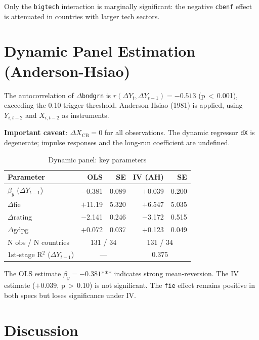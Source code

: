 \documentclass[12pt,a4paper]{article}
\begin{document}
\noindent Only the \texttt{bigtech} interaction is marginally significant:
the negative \texttt{cbenf} effect is attenuated in countries with larger
tech sectors.

\section{Dynamic Panel Estimation (Anderson-Hsiao)}

The autocorrelation of $\Delta$\texttt{bndgrn} is
$r(\Delta Y_t, \Delta Y_{t-1}) = -0.513$ (p\,$<$\,0.001), exceeding
the 0.10 trigger threshold. Anderson-Hsiao (1981) is applied, using
$Y_{i,t-2}$ and $X_{i,t-2}$ as instruments.

\noindent\textbf{Important caveat}: $\Delta X_{\text{CB}} = 0$ for all
observations. The dynamic regressor \texttt{dX} is degenerate; impulse
responses and the long-run coefficient are undefined.

\begin{table}[H]
\centering
\caption{Dynamic panel: key parameters}
\label{tab:dynamic}
\begin{tabular}{lrrrr}
\toprule
Parameter & OLS & SE & IV (AH) & SE \\
\midrule
$\beta_y$ ($\Delta Y_{t-1}$) & $-$0.381 & 0.089 & $+$0.039 & 0.200 \\
$\Delta$fie & $+$11.19 & 5.320 & $+$6.547 & 5.035 \\
$\Delta$rating & $-$2.141 & 0.246 & $-$3.172 & 0.515 \\
$\Delta$gdpg & $+$0.072 & 0.037 & $+$0.123 & 0.049 \\
\midrule
N obs / N countries & \multicolumn{2}{c}{131 / 34} &
                      \multicolumn{2}{c}{131 / 34} \\
1st-stage R$^2$ ($\Delta Y_{t-1}$) & \multicolumn{2}{c}{---} &
                                      \multicolumn{2}{c}{0.375} \\
\bottomrule
\end{tabular}
\end{table}

\noindent The OLS estimate $\beta_y = -0.381$*** indicates strong
mean-reversion. The IV estimate ($+0.039$, p\,$>$\,0.10) is not significant.
The \texttt{fie} effect remains positive in both specs but loses significance
under IV.

\section{Discussion}
\end{document}

